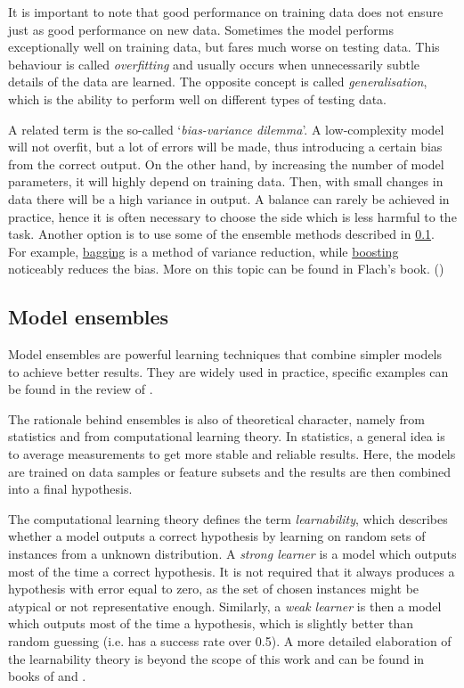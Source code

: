 It is important to note that good performance on training data does not ensure 
just as good performance on new data. Sometimes the model performs 
exceptionally well on training data, but fares much worse on testing data. 
This behaviour is called \emph{overfitting} and usually occurs when 
unnecessarily subtle details of the data are learned. The opposite concept 
is called \emph{generalisation}, which is the ability to perform well on 
different types of testing data.

A related term is the so-called `\emph{bias-variance dilemma}'. A 
low-complexity model will not overfit, but a lot of errors will be made, thus 
introducing a certain bias from the correct output. On the other hand, by 
increasing the number of model parameters, it will highly depend on training 
data. Then, with small changes in data there will be a high variance in 
output. A balance can rarely be achieved in practice, hence it is often 
necessary to choose the side which is less harmful to the task. Another option
is to use some of the ensemble methods described in \ref{ensemble}. For
example, \hyperref[bagging]{bagging} is a method of variance reduction, while
\hyperref[boosting]{boosting} noticeably reduces the bias. More on this topic
can be found in Flach's book. (\citet[p.~93--94,~338]{Flach:2012:MLA:2490546})


\subsection{Model ensembles} \label{ensemble}
Model ensembles are powerful learning techniques that combine simpler models 
to achieve better results. They are widely used in practice, specific examples
can be found in the review of \cite{Rokach:2009:TCE:1609202.1609436}.

The rationale behind ensembles is also of theoretical character, namely from
statistics and from computational learning theory. In statistics, a general
idea is to average measurements to get more stable and reliable results.
Here, the models are trained on data samples or feature subsets and the results
are then combined into a final hypothesis.

The computational learning theory defines the term \emph{learnability},
which describes whether a model outputs a correct hypothesis by learning on
random sets of instances from a unknown distribution. A \emph{strong learner}
is a model which outputs most of the time a correct hypothesis. It is not
required that it always produces a hypothesis with error equal to zero, as 
the set of chosen instances might be atypical or not representative enough.
Similarly, a \emph{weak learner} is then a model which outputs most of the time
a hypothesis, which is slightly better than random guessing (i.e. has a
success rate over 0.5). A more detailed elaboration of the learnability
theory is beyond the scope of this work and can be found in books 
of \citep{Flach:2012:MLA:2490546} and \citep{Mitchell:1997:ML:541177}.

